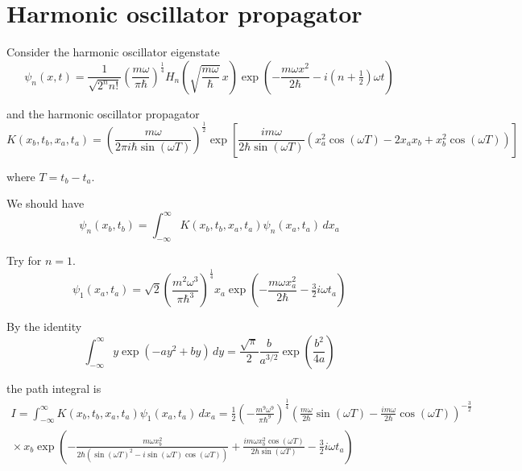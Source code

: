 

\section*{Harmonic oscillator propagator}

Consider the harmonic oscillator eigenstate
\begin{equation*}
\psi_n(x,t)=\frac{1}{\sqrt{2^nn!}}\left(\frac{m\omega}{\pi\hbar}\right)^\frac{1}{4}
H_n\left(\sqrt{\frac{m\omega}{\hbar}}\,x\right)
\exp\left(-\frac{m\omega x^2}{2\hbar}-i\left(n+\tfrac{1}{2}\right)\omega t\right)
\end{equation*}

and the harmonic oscillator propagator
\begin{equation*}
K(x_b,t_b,x_a,t_a)
=\left(\frac{m\omega}{2\pi i\hbar\sin(\omega T)}\right)^\frac{1}{2}
\exp\left[
\frac{im\omega}{2\hbar\sin(\omega T)}
\left(x_a^2\cos(\omega T)-2x_ax_b+x_b^2\cos(\omega T)\right)
\right]
\end{equation*}

where $T=t_b-t_a$.

\bigskip
We should have
\begin{equation*}
\psi_n(x_b,t_b)=\int_{-\infty}^\infty K(x_b,t_b,x_a,t_a)\psi_n(x_a,t_a)\,dx_a
\end{equation*}

Try for $n=1$.
\begin{equation*}
\psi_1(x_a,t_a)=\sqrt2\left(\frac{m^2\omega^3}{\pi\hbar^3}\right)^\frac{1}{4}
x_a\exp\left(-\frac{m\omega x_a^2}{2\hbar}-\tfrac{3}{2}i\omega t_a\right)
\end{equation*}

By the identity
\begin{equation*}
\int_{-\infty}^\infty y\exp\left(-ay^2+by\right)\,dy
=\frac{\sqrt\pi}{2}\frac{b}{a^{3/2}}\exp\left(\frac{b^2}{4a}\right)
\end{equation*}

the path integral is
\begin{multline*}
I=\int_{-\infty}^\infty K(x_b,t_b,x_a,t_a)\psi_1(x_a,t_a)\,dx_a
=\frac{1}{2}\left(-\frac{m^9\omega^9}{\pi\hbar^9}\right)^\frac{1}{4}
\left(\frac{m\omega}{2\hbar}\sin(\omega T)
-\frac{im\omega}{2\hbar}\cos(\omega T)\right)^{-\frac{3}{2}}
\\{}\times
x_b\exp\left(
-\frac{m\omega x_b^2}
{2\hbar\left(\sin(\omega T)^2-i\sin(\omega T)\cos(\omega T)\right)}
+\frac{im\omega x_b^2\cos(\omega T)}{2\hbar\sin(\omega T)}-\tfrac{3}{2}i\omega t_a
\right)
\end{multline*}

